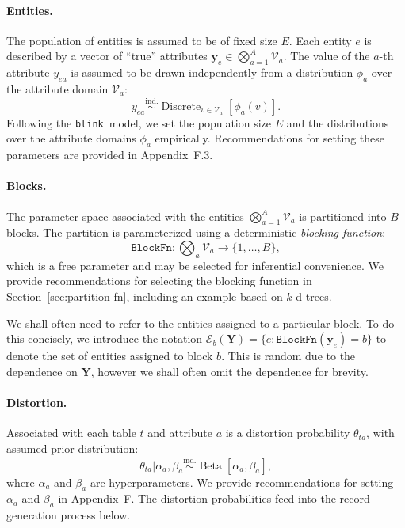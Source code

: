 \documentclass[12pt,letterpaper]{article}
\renewcommand\vec{\bm}
\newcommand{\blockfn}{\mathtt{BlockFn}} %
\newcommand{\valset}{\mathcal{V}} %
\newcommand{\partset}{\mathcal{E}} %
\newcommand{\1}[1]{\mathbb{I}\!\left[#1\right]} %
\newcommand{\blink}{\texttt{\upshape \lowercase{blink}}} %
\begin{document}
\paragraph{Entities.} 
The population of entities is assumed to be of fixed size $E$.
Each entity $e$ is described by a vector of ``true'' attributes 
$\vec{y}_e \in \bigotimes_{a=1}^{A} \valset_{a}$.
The value of the $a$-th attribute $y_{ea}$ is assumed to be drawn 
independently from a distribution 
$\phi_{a}$ over the attribute domain $\valset_{a}$:
\begin{equation}
y_{ea} \overset{\mathrm{ind.}}{\sim}
  \operatorname{Discrete}_{v \in \valset_{a}} [\phi_{a}(v)].
\end{equation}
Following the \blink\ model, we set the population size $E$ and 
the distributions over the attribute domains $\phi_{a}$ empirically.
Recommendations for setting these parameters are provided in 
Appendix~F.3.

\paragraph{Blocks.} 
The parameter space associated with the entities 
$\bigotimes_{a=1}^{A} \valset_{a}$ is partitioned into $B$ blocks. 
The partition is parameterized using a deterministic 
\emph{blocking function}:
\begin{equation}
  \blockfn: \bigotimes_{a} \valset_{a} \to \{1,\ldots, B\},
  \label{eqn:part-fn}
\end{equation}
which is a free parameter and may be selected for inferential 
  convenience. 
We provide recommendations for selecting the blocking function in 
Section~\ref{sec:partition-fn}, including an example based on $k$-d trees.

We shall often need to refer to the entities assigned to a particular block. 
To do this concisely, we introduce the notation 
$\partset_{b}(\vec{Y}) = \{e: \blockfn(\vec{y}_{e}) = b\}$ to denote 
the set of entities assigned to block $b$. 
This is random due to the dependence on $\vec{Y}$, however we shall often 
omit the dependence for brevity.


\paragraph{Distortion.} Associated with each table $t$ and 
attribute $a$ is a distortion probability $\theta_{ta}$, 
with assumed prior distribution:
\begin{equation}
\theta_{ta}|\alpha_{a}, \beta_{a} \overset{\mathrm{ind.}}{\sim}
\operatorname{Beta}[\alpha_{a}, \beta_{a}],
\end{equation}
where $\alpha_{a}$ and $\beta_{a}$ are hyperparameters.
We provide recommendations for setting $\alpha_{a}$ and $\beta_{a}$ in 
Appendix~F.
The distortion probabilities feed into the record-generation process below.
\end{document}
